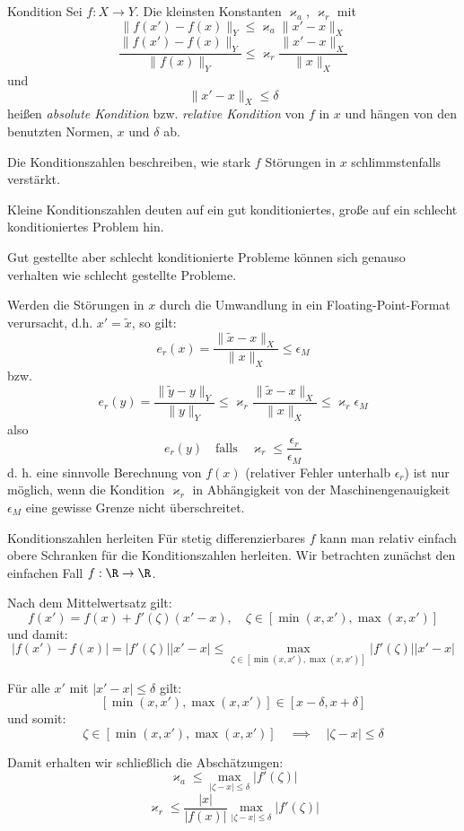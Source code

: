\begin{defi}{Kondition}
    Sei $f: X \to Y$.
    Die kleinsten Konstanten $\varkappa_a$, $\varkappa_r$ mit
    \[
        \| f(x') - f(x) \|_Y \leq \varkappa_a \| x' - x \|_X
    \]
    \[
        \frac{\| f(x') - f(x) \|_Y}{\| f(x) \|_Y} \leq \varkappa_r \frac{\| x' - x \|_X}{\| x \|_X}
    \]
    und
    \[
        \| x' - x \|_X \leq \delta
    \]
    heißen \emph{absolute Kondition} bzw. \emph{relative Kondition} von $f$ in $x$ und hängen von den benutzten Normen, $x$ und $\delta$ ab.

    Die Konditionszahlen beschreiben, wie stark $f$ Störungen in $x$ schlimmstenfalls verstärkt.

    Kleine Konditionszahlen deuten auf ein gut konditioniertes, große auf ein schlecht konditioniertes Problem hin.

    Gut gestellte aber schlecht konditionierte Probleme können sich genauso verhalten wie schlecht gestellte Probleme.

    Werden die Störungen in $x$ durch die Umwandlung in ein Floating-Point-Format verursacht, d.h. $x' =  \tilde{x}$, so gilt:
    \[
        e_r(x) = \frac{\| \tilde{x} - x \|_X}{\| x \|_X} \leq \epsilon_M
    \]
    bzw.
    \[
        e_r(y) = \frac{\| \tilde{y} - y \|_Y}{\| y \|_Y} \leq \varkappa_r \frac{\| \tilde{x} - x \|_X}{\| x \|_X} \leq \varkappa_r \epsilon_M
    \]
    also
    \[
        e_r(y) \quad \text{falls} \quad \varkappa_r \leq \frac{\epsilon_r}{\epsilon_M}
    \]
    d. h. eine sinnvolle Berechnung von $f(x)$ (relativer Fehler unterhalb $\epsilon_r$) ist nur möglich, wenn die Kondition $\varkappa_r$ in Abhängigkeit von der Maschinengenauigkeit $\epsilon_M$ eine gewisse Grenze nicht überschreitet.
\end{defi}

\begin{bonus}{Konditionszahlen herleiten}
    Für stetig differenzierbares $f$ kann man relativ einfach obere Schranken für die Konditionszahlen herleiten.
    Wir betrachten zunächst den einfachen Fall $f: \R \to \R$.

    Nach dem Mittelwertsatz gilt:
    \[
        f(x') = f(x) + f'(\zeta)(x' - x), \quad \zeta \in [ \min(x, x') , \max(x, x') ]
    \]
    und damit:
    \[
        | f(x') - f(x) | = | f'(\zeta) | | x' - x | \leq \max_{\zeta \in [ \min(x, x') , \max(x, x') ]} | f'(\zeta) | | x' - x |
    \]

    Für alle $x'$ mit $| x' - x | \leq \delta$ gilt:
    \[
        [ \min(x, x') , \max(x, x') ] \in [ x - \delta, x + \delta ]
    \]
    und somit:
    \[
        \zeta \in [ \min(x, x') , \max(x, x') ] \quad \implies \quad | \zeta - x | \leq \delta
    \]

    Damit erhalten wir schließlich die Abschätzungen:
    \[
        \varkappa_a \leq \max_{| \zeta - x | \leq \delta} | f'(\zeta) |
    \]
    \[
        \varkappa_r \leq \frac{| x |}{| f(x) |} \max_{| \zeta - x | \leq \delta} | f'(\zeta) |
    \]
\end{bonus}

